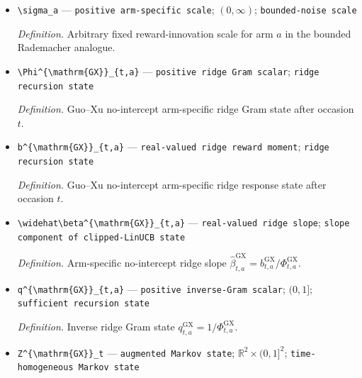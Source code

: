 \documentclass{article}
\begin{document}
\begin{itemize}
  \par\smallskip\noindent\emph{Definition.} Independent centered two-point innovation with \(P(R_{t,a}=+1)=P(R_{t,a}=-1)=1/2\), independent across occasions and arms and independent of the contexts.
  \item \texttt{\textbackslash{}\allowbreak{}sigma\_\allowbreak{}a} --- \texttt{positive arm-\allowbreak{}specific scale}; \((0,\infty)\); \texttt{bounded-\allowbreak{}noise scale}
  \par\smallskip\noindent\emph{Definition.} Arbitrary fixed reward-innovation scale for arm \(a\) in the bounded Rademacher analogue.
  \item \texttt{\textbackslash{}\allowbreak{}Phi\textasciicircum{}\{\textbackslash{}\allowbreak{}mathrm\{GX\}\allowbreak{}\}\allowbreak{}\_\allowbreak{}\{t,\allowbreak{}a\}\allowbreak{}} --- \texttt{positive ridge Gram scalar}; \texttt{ridge recursion state}
  \par\smallskip\noindent\emph{Definition.} Guo--Xu no-intercept arm-specific ridge Gram state after occasion \(t\).
  \item \texttt{b\textasciicircum{}\{\textbackslash{}\allowbreak{}mathrm\{GX\}\allowbreak{}\}\allowbreak{}\_\allowbreak{}\{t,\allowbreak{}a\}\allowbreak{}} --- \texttt{real-\allowbreak{}valued ridge reward moment}; \texttt{ridge recursion state}
  \par\smallskip\noindent\emph{Definition.} Guo--Xu no-intercept arm-specific ridge response state after occasion \(t\).
  \item \texttt{\textbackslash{}\allowbreak{}widehat\textbackslash{}\allowbreak{}beta\textasciicircum{}\{\textbackslash{}\allowbreak{}mathrm\{GX\}\allowbreak{}\}\allowbreak{}\_\allowbreak{}\{t,\allowbreak{}a\}\allowbreak{}} --- \texttt{real-\allowbreak{}valued ridge slope}; \texttt{slope component of clipped-\allowbreak{}LinUCB state}
  \par\smallskip\noindent\emph{Definition.} Arm-specific no-intercept ridge slope \(\widehat\beta^{\mathrm{GX}}_{t,a}=b^{\mathrm{GX}}_{t,a}/\Phi^{\mathrm{GX}}_{t,a}\).
  \item \texttt{q\textasciicircum{}\{\textbackslash{}\allowbreak{}mathrm\{GX\}\allowbreak{}\}\allowbreak{}\_\allowbreak{}\{t,\allowbreak{}a\}\allowbreak{}} --- \texttt{positive inverse-\allowbreak{}Gram scalar}; \((0,1]\); \texttt{sufficient recursion state}
  \par\smallskip\noindent\emph{Definition.} Inverse ridge Gram state \(q^{\mathrm{GX}}_{t,a}=1/\Phi^{\mathrm{GX}}_{t,a}\).
  \item \texttt{Z\textasciicircum{}\{\textbackslash{}\allowbreak{}mathrm\{GX\}\allowbreak{}\}\allowbreak{}\_\allowbreak{}t} --- \texttt{augmented Markov state}; \(\mathbb R^2\times(0,1]^2\); \texttt{time-\allowbreak{}homogeneous Markov state}

\end{itemize}
\end{document}
